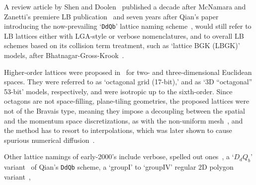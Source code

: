    A review article by Shen and  Doolen~\cite{1998-ChenS+DoolenGD-AnnuRevFluidMech}  published  a  decade  after  McNamara  and
    Zanetti's premiere LB publication~\cite{1988-McNamaraGR+ZanettiG-PhysRevLett} and seven years after Qian's paper introducing
    the now-prevailing `\texttt{DdQb}' lattice naming scheme~\cite{1991-QianYH+LallemandP-AdvKinTheoContMech}, would still refer
    to LB lattices either with LGA-style or verbose nomenclatures, and to  overall  LB  schemes  based  on  its  collision  term
    treatment,  such  as  `lattice  BGK  (LBGK)'  models,   after   Bhatnagar-Gross-Krook~\cite{1954-BhatnagarPL+KrookM-PhysRev,
    2003-LiboffRL-bookSpringer, 2011-HarrisS-Dover}.

    Higher-order lattices were proposed  in~\cite{1998-PavloP+VahalaL-PhysRevLett}  for  two-  and  three-dimensional  Euclidean
    spaces. They were referred to as `octagonal grid (17-bit),' and as `3D ``octagonal'' 53-bit' models, respectively, and  were
    isotropic up to the sixth-order. Since octagons are not space-filling, plane-tiling geometries, the proposed  lattices  were
    not of the Bravais type, meaning they impose a decoupling between the spatial and the  momentum  space  discretizations,  as
    with the non-uniform mesh~\cite{1996-HeX+DemboM-JComputPhys}, and the method has to  resort  to  interpolations,  which  was
    later shown to cause spurious numerical diffusion~\cite[p.~429]{2006-ShanX+ChenH-JFluidMech}.

    Other  lattice  namings  of  early-2000's  include  verbose,  spelled  out ones~\cite{2001-dHumieresD+LallemandP-PhysRevE,
    2005-LuXY-IntJModPhysC},  a  `$D_dQ_b$'  variant~\cite{2003-NourgalievRR+JosephD-IntJMulFlow}  of
    Qian's \texttt{DdQb} scheme, a `groupI' to `groupIV' regular 2D polygon variant~\cite{2003-WatariM+TsutaharaM-PhysRevE},





